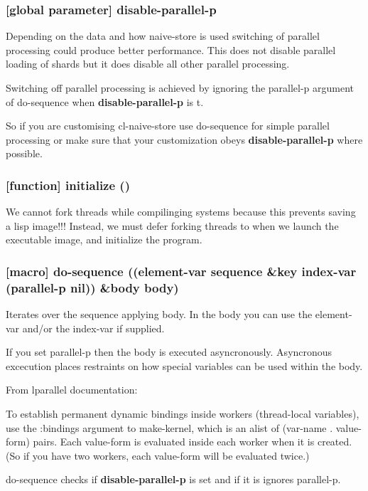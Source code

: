 \documentclass[11pt]{article}
\begin{document}
\subsubsection{[global parameter] \textbf{disable-parallel-p}}
\label{sec:orgbfd2372}

Depending on the data and how naive-store is used switching of
parallel processing could produce better performance. This does not
disable parallel loading of shards but it does disable all other
parallel processing.

Switching off parallel processing is achieved by ignoring the
parallel-p argument of do-sequence when \textbf{disable-parallel-p} is t.

So if you are customising cl-naive-store use do-sequence for simple
parallel processing or make sure that your customization obeys
\textbf{disable-parallel-p} where possible.

\subsubsection{[function] initialize ()}
\label{sec:org037665d}

We cannot fork threads while compilinging systems because this
prevents saving a lisp image!!!  Instead, we must defer forking
threads to when we launch the executable image, and initialize the
program.

\subsubsection{[macro] do-sequence ((element-var sequence \&key index-var (parallel-p nil)) \&body body)}
\label{sec:orgff76d4c}

Iterates over the sequence applying body. In the body you can use the
element-var and/or the index-var if supplied.

If you set parallel-p then the body is executed
asyncronously. Asyncronous excecution places restraints on how special
variables can be used within the body.

From lparallel documentation:

To establish permanent dynamic bindings inside workers (thread-local
variables), use the :bindings argument to make-kernel, which is an
alist of (var-name . value-form) pairs. Each value-form is evaluated
inside each worker when it is created. (So if you have two workers,
each value-form will be evaluated twice.)

do-sequence checks if \textbf{disable-parallel-p} is set and if it is ignores
parallel-p.
\end{document}
